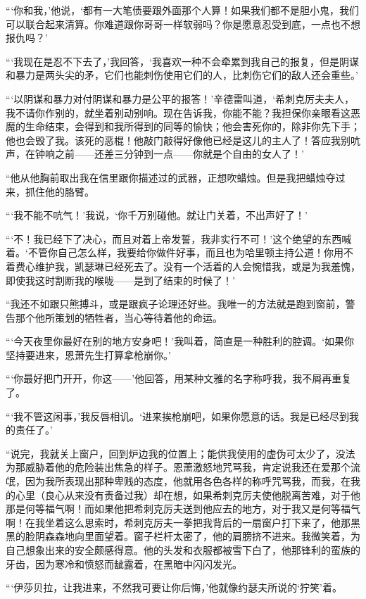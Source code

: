 \par “‘你和我，’他说，‘都有一大笔债要跟外面那个人算！如果我们都不是胆小鬼，我们可以联合起来清算。你难道跟你哥哥一样软弱吗？你是愿意忍受到底，一点也不想报仇吗？’
\par “‘我现在是忍不下去了，’我回答，‘我喜欢一种不会牵累到我自己的报复，但是阴谋和暴力是两头尖的矛，它们也能刺伤使用它们的人，比刺伤它们的敌人还会重些。’
\par “‘以阴谋和暴力对付阴谋和暴力是公平的报答！’辛德雷叫道，‘希刺克厉夫夫人，我不请你作别的，就坐着别动别响。现在告诉我，你能不能？我担保你亲眼看这恶魔的生命结束，会得到和我所得到的同等的愉快；他会害死你的，除非你先下手；他也会毁了我。该死的恶棍！他敲门敲得好像他已经是这儿的主人了！答应我别吭声，在钟响之前——还差三分钟到一点——你就是个自由的女人了！’
\par “他从他胸前取出我在信里跟你描述过的武器，正想吹蜡烛。但是我把蜡烛夺过来，抓住他的胳臂。
\par “‘我不能不吭气！’我说，‘你千万别碰他。就让门关着，不出声好了！'
\par “‘不！我已经下了决心，而且对着上帝发誓，我非实行不可！’这个绝望的东西喊着。‘不管你自己怎么样，我要给你做件好事，而且也为哈里顿主持公道！你用不着费心维护我，凯瑟琳已经死去了。没有一个活着的人会惋惜我，或是为我羞愧，即使我这时割断我的喉咙——是到了结束的时候了！’
\par “我还不如跟只熊搏斗，或是跟疯子论理还好些。我唯一的方法就是跑到窗前，警告那个他所策划的牺牲者，当心等待着他的命运。
\par “‘今天夜里你最好在别的地方安身吧！’我叫着，简直是一种胜利的腔调。‘如果你坚持要进来，恩萧先生打算拿枪崩你。’
\par “‘你最好把门开开，你这——’他回答，用某种文雅的名字称呼我，我不屑再重复了。
\par “‘我不管这闲事，’我反唇相讥。‘进来挨枪崩吧，如果你愿意的话。我是已经尽到我的责任了。’
\par “说完，我就关上窗户，回到炉边我的位置上；能供我使用的虚伪可太少了，没法为那威胁着他的危险装出焦急的样子。恩萧激怒地咒骂我，肯定说我还在爱那个流氓，因为我所表现出那种卑贱的态度，他就用各色各样的称呼咒骂我，而我，在我的心里（良心从来没有责备过我）却在想，如果希刺克厉夫使他脱离苦难，对于他那是何等福气啊！而如果他把希刺克厉夫送到他应去的地方，对于我又是何等福气啊！在我坐着这么思索时，希刺克厉夫一拳把我背后的一扇窗户打下来了，他那黑黑的脸阴森森地向里面望着。窗子栏杆太密了，他的肩膀挤不进来。我微笑着，为自己想象出来的安全颇感得意。他的头发和衣服都被雪下白了，他那锋利的蛮族的牙齿，因为寒冷和愤怒而龇露着，在黑暗中闪闪发光。
\par “‘伊莎贝拉，让我进来，不然我可要让你后悔，’他就像约瑟夫所说的‘狞笑’着。
